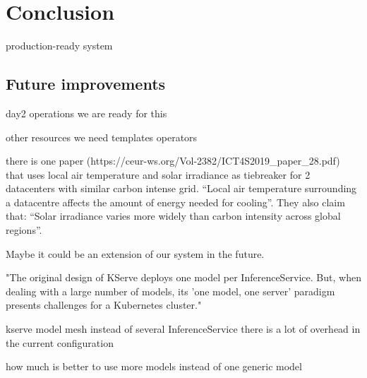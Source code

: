 \chapter{Conclusion}
\label{cha:conclusion}



production-ready system

\section{Future improvements}

day2 operations
we are ready for this

other resources
we need
templates
operators



there is one paper (https://ceur-ws.org/Vol-2382/ICT4S2019_paper_28.pdf) that uses local air temperature and solar irradiance as tiebreaker for 2 datacenters with similar carbon intense grid. 
“Local air temperature surrounding a datacentre affects the amount of energy needed for cooling”. 
They also claim that: “Solar irradiance varies more widely than carbon intensity across global regions”.

Maybe it could be an extension of our system in the future.



"The original design of KServe deploys one model per InferenceService. But, when dealing with a large number of models, its 'one model, one server' paradigm presents challenges for a Kubernetes cluster."

kserve model mesh instead of several InferenceService
there is a lot of overhead in the current configuration

how much is better to use more models instead of one generic model 

\newpage


